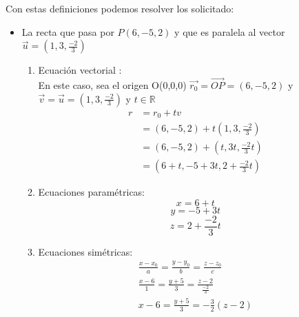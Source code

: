 \documentclass[12pt]{article}
\begin{document}
\begin{itemize}
Con estas definiciones podemos resolver los solicitado:
\begin {itemize}
\item La recta que pasa por $P(6,-5,2)$ y que es paralela al vector $\vec{u}=(1,3,\frac{-2}{3})$
\begin{enumerate}
\item Ecuación vectorial :\\
  En este caso, sea el origen O(0,0,0) $\vec{r_0} = \vec{OP} = (6, -5, 2)$  y  $\vec{v} = \vec{u} = (1,3,\frac{-2}{3})  $ y $t \in \mathds{R} $
     \begin{equation*}
  \begin{split}
    r &= r_0 + tv \\
    &= (6, -5, 2)  + t(1,3,\frac{-2}{3}) \\
    &= (6, -5, 2)  + (t,3t,\frac{-2}{3}t)\\
    &= (6+t, -5+3t, 2 + \frac{-2}{3}t)
  \end{split}
     \end{equation*}
   \item Ecuaciones paramétricas:
     $$x = 6+t $$
     $$y = -5+3t$$
     $$z =  2 + \frac{-2}{3}t $$
   \item Ecuaciones simétricas:
      \begin{equation*}
      \begin{split}
        \frac{x-x_0}{a} = \frac{y-y_0}{b} = \frac{z-z_0}{c} \\
        \frac{x-6}{1} = \frac{y+5}{3} = \frac{z-2}{\frac{-2}{3}} \\
        x-6 = \frac{y+5}{3} = -\frac{3}{2}(z-2) \\
      \end{split}
       \end{equation*}
\end{enumerate}
\end{itemize}


\end{itemize}
\end{document}
